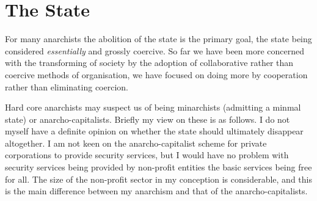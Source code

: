 \section{The State}\label{State}

For many anarchists the abolition of the state is the primary goal, the state being considered {\it essentially} and grossly coercive.
So far we have been more concerned with the transforming of society by the adoption of collaborative rather than coercive methods of organisation, we have focused on doing more by cooperation rather than eliminating coercion.

Hard core anarchists may suspect us of being minarchists (admitting a minmal state) or anarcho-capitalists.
Briefly my view on these is as follows.
I do not myself have a definite opinion on whether the state should ultimately disappear altogether.
I am not keen on the anarcho-capitalist scheme for private corporations to provide security services, but I would have no problem with security services being provided by non-profit entities the basic services being free for all.
The size of the non-profit sector in my conception is considerable, and this is the main difference between my anarchism and that of the anarcho-capitalists.



